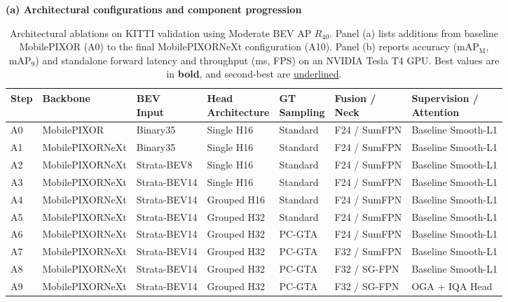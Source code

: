 \begin{table}[t]
\centering\small
\caption{Architectural ablations on KITTI validation using Moderate BEV AP $R_{40}$. Panel (a) lists additions from baseline MobilePIXOR (A0) to the final MobilePIXORNeXt configuration (A10). Panel (b) reports accuracy ($\text{mAP}_{\mathrm{M}}$, $\text{mAP}_9$) and standalone forward latency and throughput (ms, FPS) on an NVIDIA Tesla T4 GPU. Best values are in \textbf{bold}, and second-best are \underline{underlined}.}
\label{tab:components}
\textbf{(a) Architectural configurations and component progression}\par\smallskip
\begingroup\footnotesize\setlength{\tabcolsep}{4pt}
\begin{tabular}{@{}lllllll@{}}
\toprule
\textbf{Step} & \textbf{Backbone} & \shortstack[l]{\textbf{BEV}\\ \textbf{Input}} & \shortstack[l]{\textbf{Head}\\ \textbf{Architecture}} & \shortstack[l]{\textbf{GT}\\ \textbf{Sampling}} & \shortstack[l]{\textbf{Fusion /}\\ \textbf{Neck}} & \shortstack[l]{\textbf{Supervision /}\\ \textbf{Attention}} \\
\midrule
A0 & MobilePIXOR & Binary35  & Single H16 & Standard & F24 / SumFPN & Baseline Smooth-L1 \\
A1 & MobilePIXORNeXt & Binary35  & Single H16 & Standard & F24 / SumFPN & Baseline Smooth-L1 \\
A2 & MobilePIXORNeXt & Strata-BEV8  & Single H16 & Standard & F24 / SumFPN & Baseline Smooth-L1 \\
A3 & MobilePIXORNeXt & Strata-BEV14 & Single H16 & Standard & F24 / SumFPN & Baseline Smooth-L1 \\
A4 & MobilePIXORNeXt & Strata-BEV14 & Grouped H16 & Standard & F24 / SumFPN & Baseline Smooth-L1 \\
A5 & MobilePIXORNeXt & Strata-BEV14 & Grouped H32 & Standard & F24 / SumFPN & Baseline Smooth-L1 \\
A6 & MobilePIXORNeXt & Strata-BEV14 & Grouped H32 & PC-GTA & F24 / SumFPN & Baseline Smooth-L1 \\
A7 & MobilePIXORNeXt & Strata-BEV14 & Grouped H32 & PC-GTA & F32 / SumFPN & Baseline Smooth-L1 \\
A8 & MobilePIXORNeXt & Strata-BEV14 & Grouped H32 & PC-GTA & F32 / SG-FPN & Baseline Smooth-L1 \\
A9 & MobilePIXORNeXt & Strata-BEV14 & Grouped H32 & PC-GTA & F32 / SG-FPN & OGA + IQA Head \\

\end{tabular}
\end{table}
